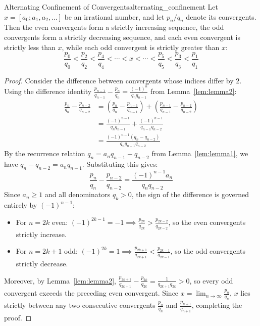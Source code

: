 \documentclass[a4paper]{article}
\begin{document}
\begin{mylemma}{Alternating Confinement of Convergents}{alternating_confinement}
  Let $x = [a_0; a_1, a_2, \dots]$ be an irrational number, and let $p_n/q_n$ denote its convergents.
  Then the even convergents form a strictly increasing sequence, the odd convergents form a strictly decreasing sequence, and each even convergent is strictly less than $x$, while each odd convergent is strictly greater than $x$:
  \[
    \frac{p_0}{q_0} < \frac{p_2}{q_2} < \frac{p_4}{q_4} < \cdots < x < \cdots < \frac{p_5}{q_5} < \frac{p_3}{q_3} < \frac{p_1}{q_1}
  \]

  \begin{proof}
    Consider the difference between convergents whose indices differ by $2$.
    Using the difference identity $\frac{p_{n-1}}{q_{n-1}} - \frac{p_n}{q_n} = \frac{(-1)^n}{q_n q_{n-1}}$ from Lemma~\ref{lem:lemma2}:
    \begin{align*}
      \frac{p_n}{q_n} - \frac{p_{n-2}}{q_{n-2}} & = \left( \frac{p_n}{q_n} - \frac{p_{n-1}}{q_{n-1}} \right) + \left( \frac{p_{n-1}}{q_{n-1}} - \frac{p_{n-2}}{q_{n-2}} \right) \\
      & = \frac{(-1)^{n-1}}{q_n q_{n-1}} + \frac{(-1)^{n-1}}{q_{n-1} q_{n-2}} \\
      & = \frac{(-1)^{n-1}(q_n - q_{n-2})}{q_n q_{n-1} q_{n-2}}
    \end{align*}
    By the recurrence relation $q_n = a_n q_{n-1} + q_{n-2}$ from Lemma~\ref{lem:lemma1}, we have $q_n - q_{n-2} = a_n q_{n-1}$.
    Substituting this gives:
    \[
      \frac{p_n}{q_n} - \frac{p_{n-2}}{q_{n-2}} = \frac{(-1)^{n-1} a_n}{q_n q_{n-2}}
    \]
    Since $a_n \ge 1$ and all denominators $q_k > 0$, the sign of the difference is governed entirely by $(-1)^{n-1}$:
    \begin{itemize}
      \item For $n = 2k$ even: $(-1)^{2k-1} = -1 \implies \frac{p_{2k}}{q_{2k}} > \frac{p_{2k-2}}{q_{2k-2}}$, so the even convergents strictly increase.
      \item For $n = 2k+1$ odd: $(-1)^{2k} = 1 \implies \frac{p_{2k+1}}{q_{2k+1}} < \frac{p_{2k-1}}{q_{2k-1}}$, so the odd convergents strictly decrease.
    \end{itemize}
    Moreover, by Lemma~\ref{lem:lemma2}, $\frac{p_{2k+1}}{q_{2k+1}} - \frac{p_{2k}}{q_{2k}} = \frac{1}{q_{2k+1} q_{2k}} > 0$, so every odd convergent exceeds the preceding even convergent.
    Since $x = \lim_{n \to \infty} \frac{p_n}{q_n}$, $x$ lies strictly between any two consecutive convergents $\frac{p_n}{q_n}$ and $\frac{p_{n+1}}{q_{n+1}}$, completing the proof.
  \end{proof}
\end{mylemma}
\end{document}
